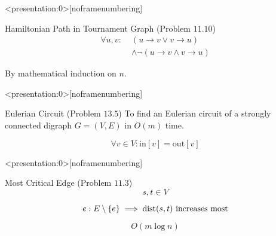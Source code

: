 
\begin{frame}<presentation:0>[noframenumbering]
  \begin{exampleblock}{Hamiltonian Path in Tournament Graph (Problem $11.10$)}
    \begin{align*}
      \forall u, v:\; &(u \to v \lor v \to u) \\
	    &\land \lnot (u \to v \land v \to u)
    \end{align*}
  \end{exampleblock}

  \pause
  \vspace{0.60cm}
  \centerline{By mathematical induction on $n$.}
\end{frame}

\begin{frame}<presentation:0>[noframenumbering]
  \begin{exampleblock}{Eulerian Circuit (Problem $13.5$)}
    To find an Eulerian circuit of a strongly connected digraph $G = (V, E)$ in $O(m)$ time. 
  \end{exampleblock}

  \pause
  \[
    \forall v \in V: \text{in}[v] = \text{out}[v]
  \]

  \pause
\end{frame}

\begin{frame}<presentation:0>[noframenumbering]
  

  \pause
  \vspace{0.20cm}
  \centerline{}
\end{frame}

\begin{frame}
  \begin{exampleblock}{Most Critical Edge (Problem $11.3$)}
    \[
      s, t \in V
    \]

    \[
      e: E \setminus \{e\} \implies \text{dist}(s,t) \text{ increases most}
    \]
  \end{exampleblock}

  \pause
  \vspace{0.30cm}
  \begin{quote}
	\centering
  \end{quote}

  \vspace{-0.50cm}
  \[
    O(m \log n)
  \]
\end{frame}

